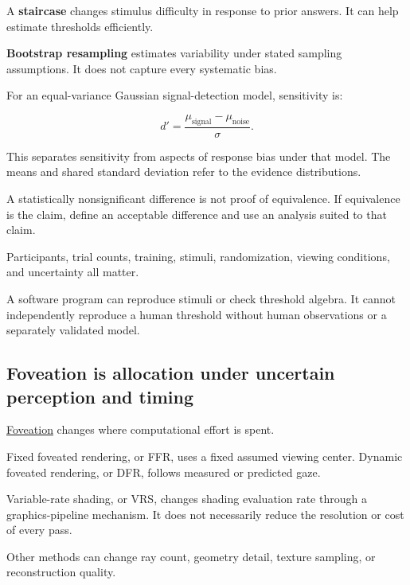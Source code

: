\hypertarget{04-visual-computing-ii-ch043-experimental-design-determines-what-the-result-supports}{}

A \textbf{staircase} changes stimulus difficulty in response to prior answers. It can help estimate thresholds efficiently.

\textbf{Bootstrap resampling} estimates variability under stated sampling assumptions. It does not capture every systematic bias.

For an equal-variance Gaussian signal-detection model, sensitivity is:

\[
d'=\frac{\mu_{\mathrm{signal}}-\mu_{\mathrm{noise}}}{\sigma}.
\]

This separates sensitivity from aspects of response bias under that model. The means and shared standard deviation refer to the evidence distributions.

A statistically nonsignificant difference is not proof of equivalence. If equivalence is the claim, define an acceptable difference and use an analysis suited to that claim.

Participants, trial counts, training, stimuli, randomization, viewing conditions, and uncertainty all matter.

A software program can reproduce stimuli or check threshold algebra. It cannot independently reproduce a human threshold without human observations or a separately validated model.

\subsection{Foveation is allocation under uncertain perception and timing}\label{04-visual-computing-ii-ch043-foveation-is-allocation-under-uncertain-perception-and-timing}

\hypertarget{04-visual-computing-ii-ch043-foveation-is-allocation-under-uncertain-perception-and-timing}{}

\hyperref[appendix-5878b813b732]{Foveation} changes where computational effort is spent.

Fixed foveated rendering, or FFR, uses a fixed assumed viewing center. Dynamic foveated rendering, or DFR, follows measured or predicted gaze.

Variable-rate shading, or VRS, changes shading evaluation rate through a graphics-pipeline mechanism. It does not necessarily reduce the resolution or cost of every pass.

Other methods can change ray count, geometry detail, texture sampling, or reconstruction quality.

